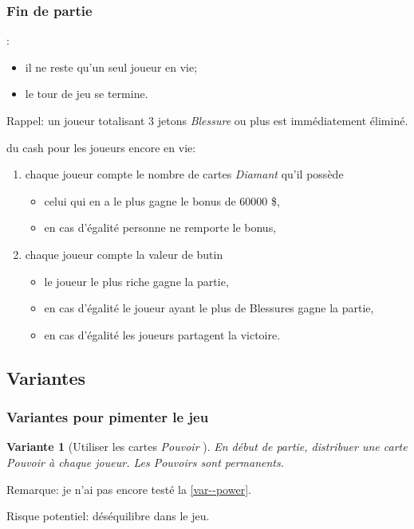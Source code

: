 \documentclass[11pt]{beamer}
\newtheorem{variant}{Variante}
\begin{document}
	\begin{frame}
		\frametitle{Fin de partie}
		
		:
		\begin{itemize}
			\item il ne reste qu'un seul joueur en vie;
			\item le  tour de jeu se termine.
		\end{itemize}
		
		Rappel: un joueur totalisant 3 jetons \emph{Blessure} ou plus est immédiatement éliminé.
		
		\vspace*{1ex}
		
		 du cash pour les joueurs encore en vie:
		\begin{enumerate}
			\item chaque joueur compte le nombre de cartes \emph{Diamant} qu'il possède 
				\begin{itemize}
					\item celui qui en a le plus gagne le bonus de 60000 \$,
					\item en cas d'égalité personne ne remporte le bonus,
				\end{itemize}
			\item chaque joueur compte la valeur de butin
			\begin{itemize}
				\item le joueur le plus riche gagne la partie,
				\item en cas d'égalité le joueur ayant le plus de Blessures gagne la partie,
				\item en cas d'égalité les joueurs partagent la victoire.
			\end{itemize}
		\end{enumerate}
	\end{frame}


\subsection{Variantes}

	\begin{frame}
		\frametitle{Variantes pour pimenter le jeu}
		
		\begin{variant}[Utiliser les cartes \emph{Pouvoir} \label{var--power}]
			En début de partie, distribuer une carte \emph{Pouvoir} à chaque joueur.
			Les Pouvoirs sont permanents.
		\end{variant}
	
		Remarque: je n'ai pas encore testé la \cref{var--power}.
		
		Risque potentiel: déséquilibre dans le jeu.
	\end{frame}

%
\end{document}

